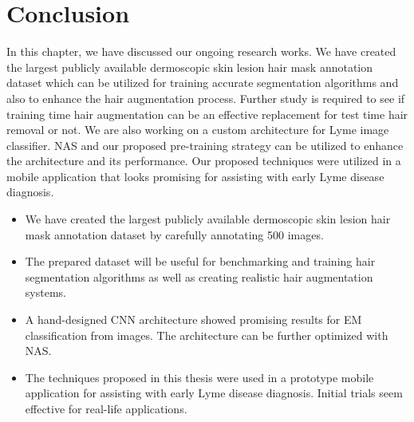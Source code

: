\section{Conclusion}\label{sec:in_progress_conclu}
In this chapter, we have discussed our ongoing research works. We have created the largest publicly available dermoscopic skin lesion hair mask annotation dataset which can be utilized for training accurate segmentation algorithms and also to enhance the hair augmentation process. Further study is required to see if training time hair augmentation can be an effective replacement for test time hair removal or not. We are also working on a custom architecture for Lyme image classifier. NAS and our proposed pre-training strategy can be utilized to enhance the architecture and its performance. Our proposed techniques were utilized in a mobile application that looks promising for assisting with early Lyme disease diagnosis.

\begin{tcolorbox}[enhanced,attach boxed title to top center={yshift=-3mm,yshifttext=-1mm},
	coltitle=black, colback=blue!5!white,colframe=blue!75!black,colbacktitle=violet!50!white,
	title=Key Points (Chapter \ref{chap:inprogress}),fonttitle=\bfseries,
	boxed title style={colframe=black} ]
	\begin{itemize}
		\item We have created the largest publicly available dermoscopic skin lesion hair mask annotation dataset by carefully annotating 500 images.
		\item The prepared dataset will be useful for benchmarking and training hair segmentation algorithms as well as creating realistic hair augmentation systems.
		\item A hand-designed CNN architecture showed promising results for EM classification from images. The architecture can be further optimized with NAS.
		\item The techniques proposed in this thesis were used in a prototype mobile application for assisting with early Lyme disease diagnosis. Initial trials seem effective for real-life applications.
	\end{itemize}
\end{tcolorbox}

